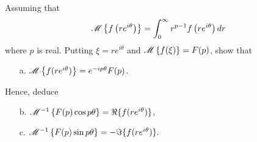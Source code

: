 \begin{problem}{8.12}
  Assuming that
  \begin{align*}
    \mathscr{M}\left\{ {f\left(r e^{i \theta}\right)} \right\} = \int_0^\infty r^{p-1} f\left(r e^{i \theta}\right) dr
  \end{align*}
  where $p$ is real. Putting $\xi = r e^{i \theta}$ and $\mathscr{M}\left\{ {f(\xi)} \right\} = F(p)$, show that
  \begin{enumerate}
    \item[a.] $\mathscr{M}\left\{ {f(r e^{i \theta})} \right\} = e^{-ip\theta}F(p)$.
  \end{enumerate}
  Hence, deduce
  \begin{enumerate}
    \item[b.] $\mathscr{M}^{-1}\left\{ {F(p) \cos p\theta} \right\} = \Re{\{f(r e^{i \theta})\}}$,
    \item[c.] $\mathscr{M}^{-1}\left\{ {F(p) \sin p\theta} \right\} = -\Im{\{f(r e^{i \theta})\}}.$
  \end{enumerate}

\end{problem}

